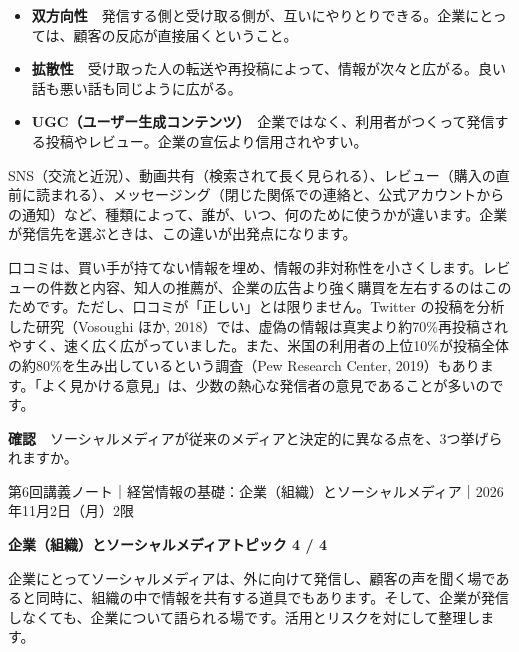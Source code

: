 \documentclass[paper=a4paper,fontsize=10pt,line_length=170mm,number_of_lines=46,baselineskip=1.6zw]{jlreq}
\newcommand\topichead[4]{%
  {\sffamily\footnotesize\color{grayt}#1\par}\vspace{1.5mm}
  {\sffamily\bfseries\LARGE #4}\hfill\colorbox{accent}{\sffamily\footnotesize\bfseries トピック #2 / #3}\par
  \vspace{1.2mm}{\color{ink}\hrule height 0.6pt}\vspace{3mm}}
\newcommand\subhead[1]{\par\vspace{2.6mm}{\sffamily\bfseries\large #1}\par\vspace{1.3mm}}
\begin{document}
\subhead{3つの特徴}
\begin{itemize}[leftmargin=1.5em,itemsep=0.6mm,topsep=0.3mm]
\item {\sffamily\bfseries 双方向性}　発信する側と受け取る側が、互いにやりとりできる。企業にとっては、顧客の反応が直接届くということ。
\item {\sffamily\bfseries 拡散性}　受け取った人の転送や再投稿によって、情報が次々と広がる。良い話も悪い話も同じように広がる。
\item {\sffamily\bfseries UGC（ユーザー生成コンテンツ）}　企業ではなく、利用者がつくって発信する投稿やレビュー。企業の宣伝より信用されやすい。
\end{itemize}\vspace{0.8mm}
\subhead{種類の違い}
SNS（交流と近況）、動画共有（検索されて長く見られる）、レビュー（購入の直前に読まれる）、メッセージング（閉じた関係での連絡と、公式アカウントからの通知）など、種類によって、誰が、いつ、何のために使うかが違います。企業が発信先を選ぶときは、この違いが出発点になります。\par\vspace{1.2mm}
\subhead{口コミが信頼と評判をつくるしくみ}
口コミは、買い手が持てない情報を埋め、情報の非対称性を小さくします。レビューの件数と内容、知人の推薦が、企業の広告より強く購買を左右するのはこのためです。ただし、口コミが「正しい」とは限りません。Twitter の投稿を分析した研究（Vosoughi ほか, 2018）では、虚偽の情報は真実より約70\%再投稿されやすく、速く広く広がっていました。また、米国の利用者の上位10\%が投稿全体の約80\%を生み出しているという調査（Pew Research Center, 2019）もあります。「よく見かける意見」は、少数の熱心な発信者の意見であることが多いのです。\par\vspace{1.2mm}
\begin{checkbox}
{\sffamily\bfseries 確認}　ソーシャルメディアが従来のメディアと決定的に異なる点を、3つ挙げられますか。\par
\end{checkbox}
\clearpage
\topichead{第6回講義ノート｜経営情報の基礎：企業（組織）とソーシャルメディア｜2026年11月2日（月）2限}{4}{4}{企業（組織）とソーシャルメディア}
企業にとってソーシャルメディアは、外に向けて発信し、顧客の声を聞く場であると同時に、組織の中で情報を共有する道具でもあります。そして、企業が発信しなくても、企業について語られる場です。活用とリスクを対にして整理します。\par\vspace{1.2mm}
\subhead{外に向けた活用}
\end{document}
